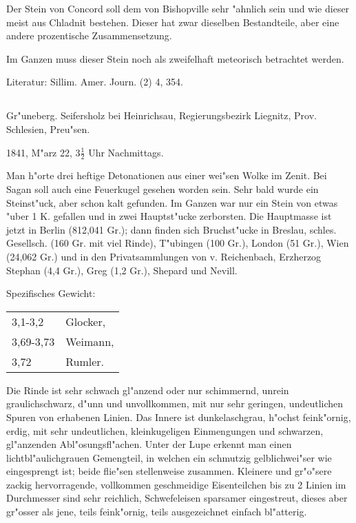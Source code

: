 \documentclass[a4paper, 11pt, oneside]{article}
\begin{document}
Der Stein von Concord soll dem von Bishopville sehr "ahnlich sein und wie dieser meist aus Chladnit bestehen. Dieser hat zwar dieselben Bestandteile, aber eine andere prozentische Zusammensetzung.

Im Ganzen muss dieser Stein noch als zweifelhaft meteorisch betrachtet werden.

\normalsize
Literatur: Sillim. Amer. Journ. (2) 4, 354.

\subsection{}
\LARGE
\paragraph{}
Gr"uneberg. Seifersholz bei Heinrichsau, Regierungsbezirk Liegnitz, Prov. Schlesien, Preu"sen.

1841, M"arz 22, $\mathfrak{3\frac{1}{2}}$ Uhr Nachmittags.

Man h"orte drei heftige Detonationen aus einer wei"sen Wolke im Zenit. Bei Sagan soll auch eine Feuerkugel gesehen worden sein. Sehr bald wurde ein Steinst"uck, aber schon kalt gefunden. Im Ganzen war nur ein Stein von etwas "uber 1 K. gefallen und in zwei Hauptst"ucke zerborsten. Die Hauptmasse ist jetzt in Berlin (812,041 Gr.); dann finden sich Bruchst"ucke in Breslau, schles. Gesellsch. (160 Gr. mit viel Rinde), T"ubingen (100 Gr.), London (51 Gr.), Wien (24,062 Gr.) und in den Privatsammlungen von v. Reichenbach, Erzherzog Stephan (4,4 Gr.), Greg (1,2 Gr.), Shepard und Nevill.

Spezifisches Gewicht:
\begin{table}[!ht]
    \centering\swabfamily\Large
    \begin{tabular}{l l}
        3,1-3,2 & Glocker,\\
        3,69-3,73 & Weimann,\\
        3,72 & Rumler.
    \end{tabular}
\end{table}

Die Rinde ist sehr schwach gl"anzend oder nur schimmernd, unrein graulichschwarz, d"unn und unvollkommen, mit nur sehr geringen, undeutlichen Spuren von erhabenen Linien. Das Innere ist dunkelaschgrau, h"ochst feink"ornig, erdig, mit sehr undeutlichen, kleinkugeligen Einmengungen und schwarzen, gl"anzenden Abl"osungsfl"achen. Unter der Lupe erkennt man einen lichtbl"aulichgrauen Gemengteil, in welchen ein schmutzig gelblichwei"ser wie eingesprengt ist; beide flie"sen stellenweise zusammen. Kleinere und gr"o"sere zackig hervorragende, vollkommen geschmeidige Eisenteilchen bis zu 2 Linien im Durchmesser sind sehr reichlich, Schwefeleisen sparsamer eingestreut, dieses aber gr"osser als jene, teils feink"ornig, teils ausgezeichnet einfach bl"atterig.
\end{document}
